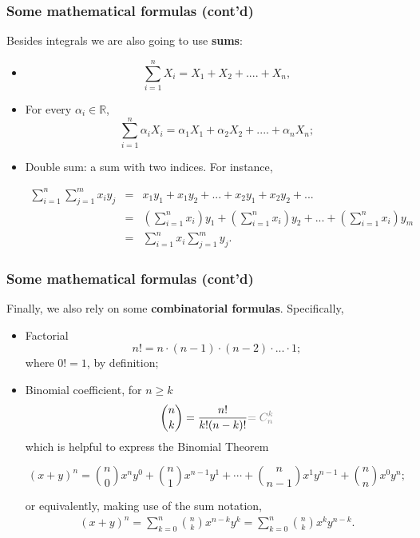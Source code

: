 \documentclass[notes=show,handout]{beamer}
\newcommand{\bea}{\begin{eqnarray}}
\newcommand{\eea}{\end{eqnarray}}
\begin{document}
\begin{frame}
\frametitle{Some mathematical formulas (cont'd)}

Besides integrals we are also going to use \textbf{sums}:

\begin{itemize}
\item $$\sum_{i=1}^{n} X_{i} = X_1 + X_2 +....+ X_n,$$
\item For every $\alpha_i \in \mathbb{R}$,  $$\sum_{i=1}^{n} \alpha_i X_{i} = \alpha_1 X_1 + \alpha_2 X_2 +....+ \alpha_n X_n;$$
\item Double sum: a sum with two indices. For instance,
\begin{small}
\bea
\sum_{i=1}^{n} \sum_{j=1}^{m}  x_{i}y_{j}  &=& x_1y_1 + x_1 y_2 +... +x_2y_1+ x_2y_2 +... \nonumber \\
&=& \left(\sum_{i=1}^{n} x_i\right) y_1 +  \left(\sum_{i=1}^{n} x_i\right) y_2 + ... +  \left(\sum_{i=1}^{n} x_i\right) y_m  \nonumber \\
&=& \sum_{i=1}^{n} x_i \sum_{j=1}^{m} y_j. \nonumber
\eea
\end{small}
\end{itemize}
\end{frame}


\begin{frame}
\frametitle{Some mathematical formulas (cont'd)}

Finally, we also rely on some \textbf{combinatorial formulas}. Specifically,

\begin{itemize}
\item Factorial
$$
n! = n \cdot (n-1) \cdot (n-2) \cdot ... \cdot 1;
$$
where $0! =1$, by definition;
\item Binomial coefficient, for $n \geq k$
$$
\binom n k =\frac{n!}{k!(n-k)!} \color{gray}{=C^{k}_n}\color{black}
$$
which is helpful to express the \color{blue} Binomial Theorem \color{black}
\begin{small}
$$(x+y)^n = {n \choose 0}x^n y^0 + {n \choose 1}x^{n-1}y^1 + \cdots + {n \choose n-1}x^1 y^{n-1} + {n \choose n}x^0 y^n;$$
\end{small}
or equivalently, making use of the sum notation,
\bea
(x+y)^n = \sum_{k=0}^n {n \choose k}x^{n-k}y^k = \sum_{k=0}^n {n \choose k}x^{k}y^{n-k}. \nonumber
\eea
\end{itemize}

\end{frame}
\end{document}
